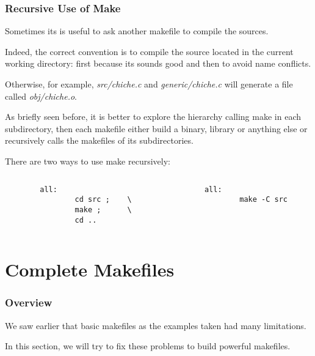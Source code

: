 
\begin{frame}[containsverbatim]
  \frametitle{Recursive Use of Make}

  Sometimes its is useful to ask another makefile to compile the sources.

  \nl

  Indeed, the correct convention is to compile the source located in
  the current working directory: first because its sounds good and then
  to avoid name conflicts.

  \nl

  Otherwise, for example, \textit{src/chiche.c} and \textit{generic/chiche.c}
  will generate a file called \textit{obj/chiche.o}.

  \nl

  As briefly seen before, it is better to explore the hierarchy calling
  make in each subdirectory, then each makefile either build a binary, library
  or anything else or recursively calls the makefiles of its subdirectories.

  \nl

  There are two ways to use make recursively:

  \begin{columns}

    \begin{column}{6cm}
      \begin{verbatim}
        all:
                cd src ;    \
                make ;      \
                cd ..
      \end{verbatim}
    \end{column}

    \begin{column}{6cm}
      \begin{verbatim}
        all:
                make -C src
      \end{verbatim}
    \end{column}
  \end{columns}
\end{frame}

%
%

\section{Complete Makefiles}


\begin{frame}
  \frametitle{Overview}

  We saw earlier that basic makefiles as the examples taken had
  many limitations.

  \nl

  In this section, we will try to fix these problems to build powerful
  makefiles.
\end{frame}

